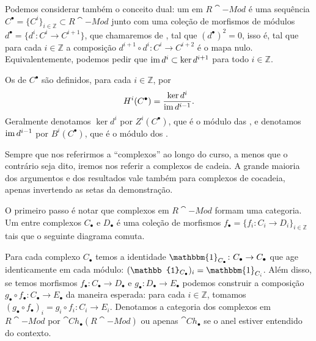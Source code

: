 Podemos considerar também o conceito dual: um  em $R\cat{-Mod}$ é uma sequência $C^\bullet = \{C^i\}_{i \in \mathbb{Z}} \subset R\cat{-Mod}$ junto com uma coleção de morfismos de módulos $d^\bullet = \{d^i \colon C^i \to C^{i + 1}\}$, que chamaremos de , tal que $(d^\bullet)^2 = 0$, isso é, tal que para cada $i \in \mathbb{Z}$ a composição $d^{i + 1} \circ d^i \colon C^i \to C^{i + 2}$ é o mapa nulo. Equivalentemente, podemos pedir que $\operatorname{im} d^i \subset \ker d^{i + 1}$ para todo $i \in \mathbb{Z}$.

Os  de $C^\bullet$ são definidos, para cada $i \in \mathbb{Z}$, por \begin{equation}
    H^i(C^\bullet) = \frac{\ker d^i}{\operatorname{im} d^{i - 1}}.
\end{equation} Geralmente denotamos $\ker d^i$ por $Z^i(C^\bullet)$, que é o módulo das , e denotamos $\operatorname{im} d^{i-1}$ por $B^i(C^\bullet)$, que é o módulo dos .

Sempre que nos referirmos a ``complexos'' ao longo do curso, a menos que o contrário seja dito, iremos nos referir a complexos de cadeia. A grande maioria dos argumentos e dos resultados vale também para complexos de cocadeia, apenas invertendo as setas da demonstração.

O primeiro passo é notar que complexos em $R\cat{-Mod}$ formam uma categoria. Um  entre complexos $C_\bullet$ e $D_\bullet$ é uma coleção de morfismos $f_\bullet = \{f_i \colon C_i \to D_i\}_{i \in \mathbb{Z}}$ tais que o seguinte diagrama comuta.

\begin{center}
\end{center}

Para cada complexo $C_\bullet$ temos a identidade $\mathbbm{1}_{C_\bullet} \colon C_\bullet \to C_\bullet$ que age identicamente em cada módulo: $(\mathbb{1}_{C_\bullet})_i = \mathbbm{1}_{C_i}$. Além disso, se temos morfismos $f_\bullet \colon C_\bullet \to D_\bullet$ e $g_\bullet \colon D_\bullet \to E_\bullet$ podemos construir a composição $g_\bullet \circ f_\bullet \colon C_\bullet \to E_\bullet$ da maneira esperada: para cada $i \in \mathbb{Z}$, tomamos $(g_\bullet \circ f_\bullet)_i = g_i \circ f_i \colon C_i \to E_i$. Denotamos a categoria dos complexos em $R\cat{-Mod}$ por $\cat{Ch}_\bullet(R\cat{-Mod})$ ou apenas $\cat{Ch}_\bullet$ se o anel estiver entendido do contexto.

